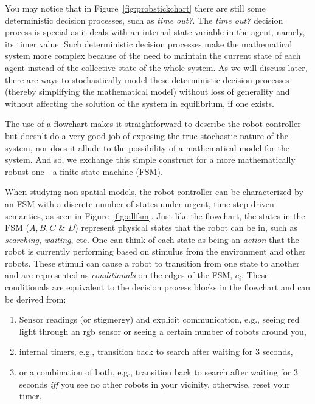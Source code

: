 \documentclass[Main.tex]{subfiles}
\begin{document}
You may notice that in Figure~\ref{fig:probstickchart} there are still some deterministic decision processes, such as \emph{time out?}. The \emph{time out?} decision process is special as it deals with an internal state variable in the agent, namely, its timer value. Such deterministic decision processes make the mathematical system more complex because of the need to maintain the current state of each agent instead of the collective state of the whole system. As we will discuss later, there are ways to stochastically model these deterministic decision processes (thereby simplifying the mathematical model) without loss of generality and without affecting the solution of the system in equilibrium, if one exists. 

The use of a flowchart makes it straightforward to describe the robot controller but doesn't do a very good job of exposing the true stochastic nature of the system, nor does it allude to the possibility of a mathematical model for the system. And so, we exchange this simple construct for a more mathematically robust one---a finite state machine (FSM).

When studying non-spatial models, the robot controller can be characterized by an FSM with a discrete number of states under urgent, time-step driven semantics, as seen in Figure~\ref{fig:allfsm}. Just like the flowchart, the states in the FSM ($A, B, C$ \& $D$) represent physical states that the robot can be in, such as  \emph{searching}, \emph{waiting}, etc. One can think of each state as being an \emph{action} that the robot is currently performing based on stimulus from the environment and other robots. These stimuli can cause a robot to transition from one state to another and are represented as \emph{conditionals} on the edges of the FSM, $c_i$. These conditionals are equivalent to the decision process blocks in the flowchart and can be derived from:
\begin{enumerate}
\item Sensor readings (or stigmergy) and explicit communication, e.g., seeing red light through an rgb sensor or seeing a certain number of robots around you,
\item internal timers, e.g., transition back to search after waiting for 3 seconds,
\item or a combination of both, e.g., transition back to search after waiting for 3 seconds \emph{iff} you see no other robots in your vicinity, otherwise, reset your timer.
\end{enumerate}
\end{document}
